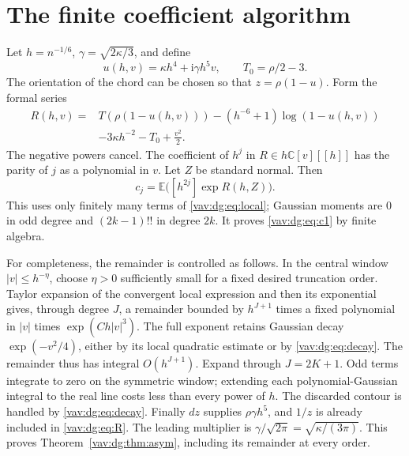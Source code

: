 \documentclass[11pt]{article}
\theoremstyle{remark}\newtheorem{remark}[theorem]{Remark}
\newcommand{\E}{\mathbb E}
\newcommand{\ii}{\mathrm i}
\begin{document}
\section{The finite coefficient algorithm}\label{vav:dg:sec:algorithm}
Let $h=n^{-1/6}$, $\gamma=\sqrt{2\kappa/3}$, and define
\[
 u(h,v)=\kappa h^4+\ii\gamma h^5v,\qquad T_0=\rho/2-3.
\]
The orientation of the chord can be chosen so that $z=\rho(1-u)$.
Form the formal series
\begin{equation}\label{vav:dg:eq:R}
\begin{split}
 R(h,v)={}&T(\rho(1-u(h,v)))
       -(h^{-6}+1)\log(1-u(h,v))\\
       &-3\kappa h^{-2}-T_0+\frac{v^2}{2}.
\end{split}
\end{equation}
The negative powers cancel. The coefficient of $h^j$ in
$R\in h\mathbb C[v][[h]]$ has the parity of $j$ as a polynomial in $v$.
Let $Z$ be standard normal. Then
\begin{equation}\label{vav:dg:eq:algorithm}
 c_j=\E\bigl([h^{2j}]\exp R(h,Z)\bigr).
\end{equation}
This uses only finitely many terms of \eqref{vav:dg:eq:local}; Gaussian moments
are $0$ in odd degree and $(2k-1)!!$ in degree $2k$.
It proves \eqref{vav:dg:eq:c1} by finite algebra.

For completeness, the remainder is controlled as follows.
In the central window $|v|\le h^{-\eta}$, choose $\eta>0$ sufficiently
small for a fixed desired truncation order. Taylor expansion of the
convergent local expression and then its exponential gives, through degree
$J$, a remainder bounded by $h^{J+1}$ times a fixed polynomial in $|v|$
times $\exp(C h|v|^3)$. The full exponent retains Gaussian decay
$\exp(-v^2/4)$, either by its local quadratic estimate or by
\eqref{vav:dg:eq:decay}. The remainder thus has integral $O(h^{J+1})$.
Expand through $J=2K+1$. Odd terms integrate to zero on the symmetric
window; extending each polynomial-Gaussian integral to the real line
costs less than every power of $h$.
The discarded contour is handled by \eqref{vav:dg:eq:decay}.
Finally $dz$ supplies $\rho\gamma h^5$, and $1/z$ is already included
in \eqref{vav:dg:eq:R}. The leading multiplier is
$\gamma/\sqrt{2\pi}=\sqrt{\kappa/(3\pi)}$.
This proves Theorem~\ref{vav:dg:thm:asym}, including its remainder at every order.
\end{document}
